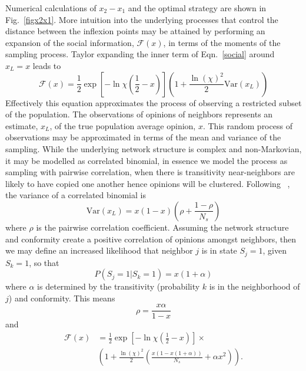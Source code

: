 \documentclass[aps,prl,twocolumn,showpacs,superscriptaddress,groupedaddress]{revtex4}
\begin{document}
Numerical calculations of $x_2-x_1$ and the optimal strategy are shown in Fig.~\ref{figx2x1}. More intuition into the underlying processes that control the distance between the inflexion points may be attained by performing an expansion of the social information, $\mathcal{F}(x)$, in terms of the moments of the sampling process. Taylor expanding the inner term %
of Eqn.~\ref{social} around $x_L=x$ leads to %
\begin{equation}
\mathcal{F}(x) = \frac{1}{2}\exp{\left[ - \ln\chi  \left(\frac{1}{2}-x\right)\right]} \left( 1 + \frac{ \ln(\chi)^2}{2}\mbox{Var}(x_L) \right)
\end{equation}
Effectively this equation approximates the process of observing a restricted subset of the population. The observations of opinions of neighbors represents an estimate, $x_L$, of the true population average opinion, $x$. This random process of observations may be approximated in terms of the mean and variance of the sampling. While the underlying network structure is complex and non-Markovian, it may be modelled as correlated binomial, in essence we model the process as sampling with pairwise correlation, when there is transitivity near-neighbors are likely to have copied one another hence opinions will be clustered. Following ~\cite{witt2004moody}, the variance of a correlated binomial is
\begin{equation}
\mbox{Var}(x_L) = x(1-x)\left( \rho + \frac{1-\rho}{N_s} \right)
\end{equation}
where $\rho$ is the pairwise correlation coefficient. Assuming the network structure and conformity create a positive correlation of opinions amongst neighbors, then we may define an increased likelihood that neighbor $j$ is in state $S_j=1$, given $S_k=1$, so that
\begin{equation}
P(S_j=1|S_k=1) = x(1+\alpha)
\end{equation}
where $\alpha$ is determined by the transitivity (probability $k$ is in the neighborhood of $j$) and conformity. This means 
\begin{equation}
\rho = \frac{x\alpha}{1-x}
\end{equation}
and
\begin{align}
\mathcal{F}(x) &= \frac{1}{2}\exp{\left[ -  \ln\chi  \left(\frac{1}{2}-x\right)\right]} \times \nonumber \\ & \left( 1 + \frac{ \ln(\chi)^2}{2}\left(\frac{x(1-x(1+\alpha))}{N_s} +  \alpha x^2  \right)   \right).
\end{align}
\end{document}
